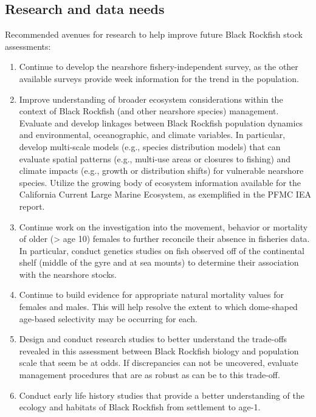 \documentclass[11pt,
  english,
  letterpaper,
]{article}
\providecommand{\tightlist}{%
  \setlength{\itemsep}{0pt}\setlength{\parskip}{0pt}}
\providecommand{\tightlist}{%
  \setlength{\itemsep}{0pt}\setlength{\parskip}{0pt}}
\begin{document}
\clearpage



\clearpage

\hypertarget{research-and-data-needs}{%
\subsection*{Research and data needs}\label{research-and-data-needs}}

Recommended avenues for research to help improve future Black Rockfish stock assessments:

\begin{enumerate}
\def\labelenumi{\arabic{enumi}.}
\tightlist
\item
  Continue to develop the nearshore fishery-independent survey, as the other available surveys provide week information for the trend in the population.
\item
  Improve understanding of broader ecosystem considerations within the context of Black Rockfish (and other nearshore species) management. Evaluate and develop linkages between Black Rockfish population dynamics and environmental, oceanographic, and climate variables. In particular, develop multi-scale models (e.g., species distribution models) that can evaluate spatial patterns (e.g., multi-use areas or closures to fishing) and climate impacts (e.g., growth or distribution shifts) for vulnerable nearshore species. Utilize the growing body of ecosystem information available for the California Current Large Marine Ecosystem, as exemplified in the PFMC IEA report.
\item
  Continue work on the investigation into the movement, behavior or mortality of older (\textgreater{} age 10) females to further reconcile their absence in fisheries data. In particular, conduct genetics studies on fish observed off of the continental shelf (middle of the gyre and at sea mounts) to determine their association with the nearshore stocks.
\item
  Continue to build evidence for appropriate natural mortality values for females and males. This will help resolve the extent to which dome-shaped age-based selectivity may be occurring for each.
\item
  Design and conduct research studies to better understand the trade-offs revealed in this assessment between Black Rockfish biology and population scale that seem be at odds. If discrepancies can not be uncovered, evaluate management procedures that are as robust as can be to this trade-off.
\item
  Conduct early life history studies that provide a better understanding of the ecology and habitats of Black Rockfish from settlement to age-1.
\end{enumerate}
\end{document}
